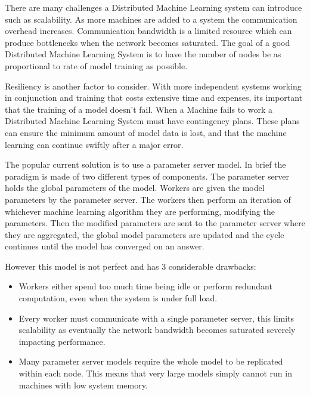 There are many challenges a Distributed Machine Learning system can introduce
such as scalability. As more machines are added to a system the communication
overhead increases. Communication bandwidth is a limited resource which can
produce bottlenecks when the network becomes saturated. The goal of a good
Distributed Machine Learning System is to have the number of nodes be as
proportional to rate of model training as possible.
\par

Resiliency is another factor to consider. With more independent systems working
in conjunction and training that costs extensive time and expenses, its
important that the training of a model doesn't fail. When a Machine fails to
work a Distributed Machine Learning System must have contingency plans. These
plans can ensure the minimum amount of model data is lost, and that the machine
learning can continue swiftly after a major error.
\par


The popular current solution is to use a parameter server model. In brief the
paradigm is made of two different types of components. The parameter server
holds the global parameters of the model. Workers are given the model
parameters by the parameter server. The workers then perform an iteration of
whichever machine learning algorithm they are performing, modifying the
parameters. Then the modified parameters are sent to the parameter server
where they are aggregated, the global model parameters are updated and the
cycle continues until the model has converged on an answer.
\par

However this model is not perfect and has 3 considerable drawbacks:
\begin{itemize}
    \item Workers either spend too much time being idle or perform redundant
    computation, even when the system is under full load.
    \cite{googlemapreduce2008}
    \item Every worker must communicate with a single parameter server, this
    limits scalability as eventually the network bandwidth becomes saturated
    severely impacting performance. \cite{LI2014ParameterServers}
    \item Many parameter server models require the whole model to be replicated
    within each node. \cite{jia2018BeyondData} This means that very large models
    simply cannot run in machines with low system memory.  
\end{itemize}


